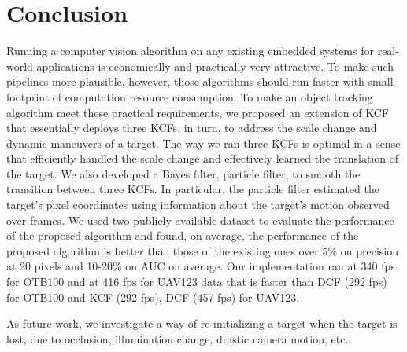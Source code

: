 \documentclass[10pt,twocolumn,letterpaper]{article}
\begin{document}

\section{Conclusion} \label{sc:Conclusion}
Running a computer vision algorithm on any existing embedded systems
for real-world applications is economically and practically very
attractive. To make such pipelines more plausible, however, those
algorithms should run faster with small footprint of computation
resource consumption. To make an object tracking algorithm meet these
practical requirements, we proposed an extension of KCF that
essentially deploys three KCFs, in turn, to address the scale change
and dynamic maneuvers of a target. The way we ran three KCFs is
optimal in a sense that efficiently handled the scale change and
effectively learned the translation of the target. We also developed a
Bayes filter, particle filter, to smooth the transition between three
KCFs. In particular, the particle filter estimated the target's pixel
coordinates using information about the target's motion observed over
frames. We used two publicly available dataset to evaluate the
performance of the proposed algorithm and found, on average, the
performance of the proposed algorithm is better than those of the
existing ones over 5\% on precision at 20 pixels and 10-20\% on AUC on
average. Our implementation ran at 340 fps for OTB100 and at 416 fps
for UAV123 data that is faster than DCF (292 fps) for OTB100 and KCF
(292 fps), DCF (457 fps) for UAV123.

As future work, we investigate a way of re-initializing a target when
the target is lost, due to occlusion, illumination change, drastic
camera motion, etc.

{\small


}
\end{document}
